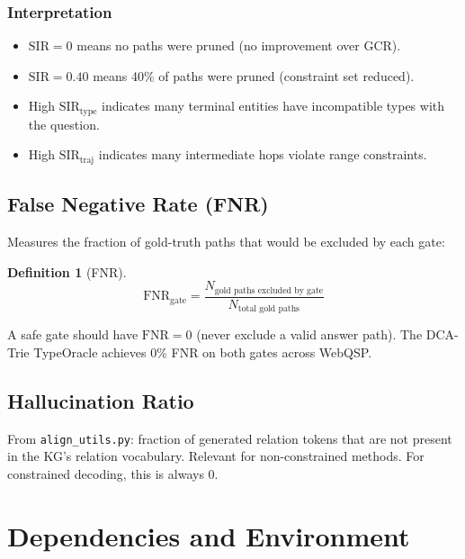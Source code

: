 \documentclass[11pt,a4paper,oneside,openany]{book}
\theoremstyle{definition}
\newtheorem{definition}{Definition}[chapter]
\newcommand{\file}[1]{\texttt{#1}}
\begin{document}
\subsection{Interpretation}

\begin{itemize}
	\item $\text{SIR} = 0$ means no paths were pruned (no improvement over GCR).
	\item $\text{SIR} = 0.40$ means 40\% of paths were pruned (constraint set reduced).
	\item High $\text{SIR}_{\text{type}}$ indicates many terminal entities have incompatible types with the question.
	\item High $\text{SIR}_{\text{traj}}$ indicates many intermediate hops violate range constraints.
\end{itemize}

\section{False Negative Rate (FNR)}

Measures the fraction of gold-truth paths that would be excluded by each gate:

\begin{definition}[FNR]
	$$\text{FNR}_{\text{gate}} = \frac{N_{\text{gold paths excluded by gate}}}{N_{\text{total gold paths}}}$$
\end{definition}

A safe gate should have $\text{FNR} = 0$ (never exclude a valid answer path). The DCA-Trie TypeOracle achieves 0\% FNR on both gates across WebQSP.

\section{Hallucination Ratio}

From \file{align\_utils.py}: fraction of generated relation tokens that are not present in the KG's relation vocabulary. Relevant for non-constrained methods. For constrained decoding, this is always 0.

\chapter{Dependencies and Environment}\label{ch:deps}
\end{document}
